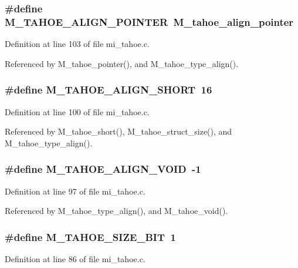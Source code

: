 \subsubsection{\setlength{\rightskip}{0pt plus 5cm}\#define M\_\-TAHOE\_\-ALIGN\_\-POINTER~\bf{M\_\-tahoe\_\-align\_\-pointer}}\label{mi__tahoe_8c_6f152d7d9ef37ac5954c2df3b62a4184}




Definition at line 103 of file mi\_\-tahoe.c.

Referenced by M\_\-tahoe\_\-pointer(), and M\_\-tahoe\_\-type\_\-align().
\subsubsection{\setlength{\rightskip}{0pt plus 5cm}\#define M\_\-TAHOE\_\-ALIGN\_\-SHORT~16}\label{mi__tahoe_8c_84f7aeb2760e5a9a6a41836d31c5f784}




Definition at line 100 of file mi\_\-tahoe.c.

Referenced by M\_\-tahoe\_\-short(), M\_\-tahoe\_\-struct\_\-size(), and M\_\-tahoe\_\-type\_\-align().
\subsubsection{\setlength{\rightskip}{0pt plus 5cm}\#define M\_\-TAHOE\_\-ALIGN\_\-VOID~-1}\label{mi__tahoe_8c_bbdbdd29401ab04d9f0a492aefc626e2}




Definition at line 97 of file mi\_\-tahoe.c.

Referenced by M\_\-tahoe\_\-type\_\-align(), and M\_\-tahoe\_\-void().
\subsubsection{\setlength{\rightskip}{0pt plus 5cm}\#define M\_\-TAHOE\_\-SIZE\_\-BIT~1}\label{mi__tahoe_8c_62a9f76898421ddfaa94307c7dc46dde}




Definition at line 86 of file mi\_\-tahoe.c.

